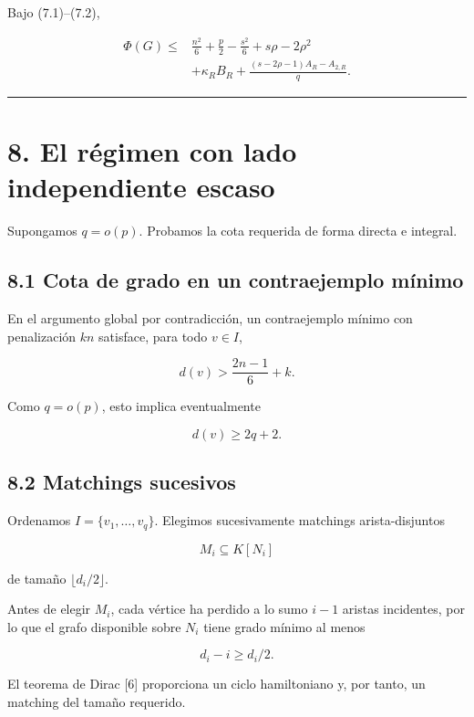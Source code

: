 \documentclass[
  11pt,
]{article}
\begin{document}
Bajo (7.1)--(7.2),

\[
\boxed{
\begin{aligned}
\Phi(G)
\le{}&
\frac{n^2}{6}+\frac p2-\frac{s^2}{6}
+s\rho-2\rho^2\\
&+
\kappa_RB_R
+
\frac{(s-2\rho-1)A_R-A_{2,R}}q.
\end{aligned}
}
\tag{7.6}
\]

\begin{center}\rule{0.5\linewidth}{0.5pt}\end{center}

\section{8. El régimen con lado independiente
escaso}\label{el-ruxe9gimen-con-lado-independiente-escaso}

Supongamos \(q=o(p)\). Probamos la cota requerida de forma directa e
integral.

\subsection{8.1 Cota de grado en un contraejemplo
mínimo}\label{cota-de-grado-en-un-contraejemplo-muxednimo}

En el argumento global por contradicción, un contraejemplo mínimo con
penalización \(kn\) satisface, para todo \(v\in I\),

\[
d(v)>
\frac{2n-1}{6}+k.
\tag{8.1}
\]

Como \(q=o(p)\), esto implica eventualmente

\[
d(v)\ge2q+2.
\tag{8.2}
\]

\subsection{8.2 Matchings sucesivos}\label{matchings-sucesivos}

Ordenamos \(I=\{v_1,\ldots,v_q\}\). Elegimos sucesivamente matchings
arista-disjuntos

\[
M_i\subseteq K[N_i]
\]

de tamaño \(\lfloor d_i/2\rfloor\).

Antes de elegir \(M_i\), cada vértice ha perdido a lo sumo \(i-1\)
aristas incidentes, por lo que el grafo disponible sobre \(N_i\) tiene
grado mínimo al menos

\[
d_i-i\ge d_i/2.
\]

El teorema de Dirac {[}6{]} proporciona un ciclo hamiltoniano y, por
tanto, un matching del tamaño requerido.
\end{document}
